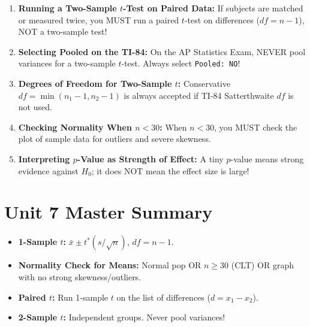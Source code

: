 \begin{trapbox}
\begin{enumerate}[leftmargin=1.2em]
  \item \textbf{Running a Two-Sample $t$-Test on Paired Data:} If subjects are matched or measured twice, you MUST run a paired $t$-test on differences ($df = n - 1$), NOT a two-sample test!
  \item \textbf{Selecting Pooled on the TI-84:} On the AP Statistics Exam, NEVER pool variances for a two-sample $t$-test. Always select \texttt{Pooled: NO}!
  \item \textbf{Degrees of Freedom for Two-Sample $t$:} Conservative $df = \min(n_1 - 1, n_2 - 1)$ is always accepted if TI-84 Satterthwaite $df$ is not used.
  \item \textbf{Checking Normality When $n < 30$:} When $n < 30$, you MUST check the plot of sample data for outliers and severe skewness.
  \item \textbf{Interpreting $p$-Value as Strength of Effect:} A tiny $p$-value means strong evidence against $H_0$; it does NOT mean the effect size is large!
\end{enumerate}
\end{trapbox}
\section{Unit 7 Master Summary}
\begin{lessonbox}
\begin{itemize}[leftmargin=1.2em]
  \item \textbf{1-Sample $t$:} $\bar{x} \pm t^*(s/\sqrt{n})$, $df = n - 1$.
  \item \textbf{Normality Check for Means:} Normal pop OR $n \ge 30$ (CLT) OR graph with no strong skewness/outliers.
  \item \textbf{Paired $t$:} Run 1-sample $t$ on the list of differences ($d = x_1 - x_2$).
  \item \textbf{2-Sample $t$:} Independent groups. Never pool variances!
\end{itemize}
\end{lessonbox}
\clearpage
